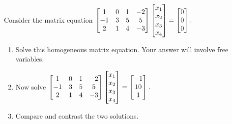 \begin{problem}
Consider the matrix equation 
$\begin{bmatrix}
\begin{matrix} 1\\-1\\2 \end{matrix}&
\begin{matrix} 0\\3\\1 \end{matrix}&
\begin{matrix} 1\\5\\4 \end{matrix}&
\begin{matrix} -2\\5\\-3 \end{matrix}
\end{bmatrix}
\begin{bmatrix}x_1\\x_2\\x_3\\x_4\end{bmatrix}
=
\begin{bmatrix}0\\0\\0\end{bmatrix}.$ 
\begin{enumerate}
 \item Solve this homogeneous matrix equation. Your answer will involve free variables. 
 \item Now solve 
$\begin{bmatrix}
\begin{matrix} 1\\-1\\2 \end{matrix}&
\begin{matrix} 0\\3\\1 \end{matrix}&
\begin{matrix} 1\\5\\4 \end{matrix}&
\begin{matrix} -2\\5\\-3 \end{matrix}
\end{bmatrix}
\begin{bmatrix}x_1\\x_2\\x_3\\x_4\end{bmatrix}
=
\begin{bmatrix}-1\\10\\1\end{bmatrix}.$ 

 \item Compare and contrast the two solutions.
\end{enumerate}
\end{problem}

